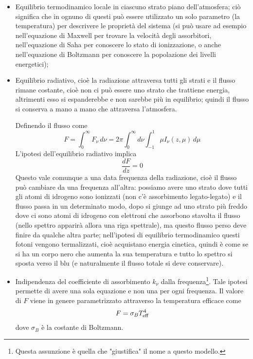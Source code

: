 \begin{itemize}
    \item Equilibrio termodinamico locale in ciascuno strato piano dell'atmosfera; ciò significa che in ognuno di questi può essere utilizzato un solo parametro (la temperatura) per descrivere le proprietà del sistema (si può usare ad esempio nell'equazione di Maxwell per trovare la velocità degli assorbitori, nell'equazione di Saha per conoscere lo stato di ionizzazione, o anche nell'equazione di Boltzmann per conoscere la popolazione dei livelli energetici);
    \item Equilibrio radiativo, cioè la radiazione attraversa tutti gli strati e il flusso rimane costante, cioè non ci può essere uno strato che trattiene energia, altrimenti esso si espanderebbe e non sarebbe più in equilibrio; quindi il flusso si conserva a mano a mano che attraversa l'atmosfera.
    
    Definendo il flusso come
    $$F=\int_{0}^{\infty} F_{\nu} \, d\nu
    =2 \pi \int_{0}^{\infty} d\nu \int_{-1}^{1} \mu I_{\nu}(z,\mu) \, d\mu$$
    L'ipotesi dell'equilibrio radiativo implica
    \begin{equation}
        \frac{dF}{dz}=0
    \end{equation}
    Questo vale comunque a una data frequenza della radiazione, cioè il flusso può cambiare da una frequenza all'altra: possiamo avere uno strato dove tutti gli atomi di idrogeno sono ionizzati (non c'è assorbimento legato-legato) e il flusso passa in un determinato modo, dopo si giunge ad uno strato più freddo dove ci sono atomi di idrogeno con elettroni che assorbono stavolta il flusso (nello spettro apparirà allora una riga spettrale), ma questo flusso perso deve finire da qualche altra parte; nell'ipotesi di equilibrio termodinamico questi fotoni vengono termalizzati, cioè acquistano energia cinetica, quindi è come se si ha un corpo nero che aumenta la sua temperatura e tutto lo spettro si sposta verso il blu (e naturalmente il flusso totale si deve conservare).
    \item Indipendenza del coefficiente di assorbimento $k_{\nu}$ dalla frequenza\footnote{Questa assunzione è quella che "giustifica" il nome a questo modello.}. Tale ipotesi permette di avere una sola equazione e non una per ogni frequenza.
    Il valore di $F$ viene in genere parametrizzato attraverso la temperatura efficace come
    \begin{equation*}
        F=\sigma_B T^4_{\rm eff}
    \end{equation*}
    dove $\sigma_B$ è la costante di Boltzmann.
\end{itemize}

